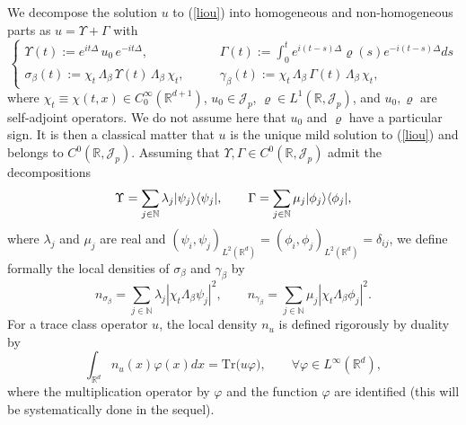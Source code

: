 \documentclass[12pt]{article}
\def \Rm {\mathbb R}
\def \Nm {\mathbb N}
\newcommand{\ds}{\displaystyle}
\newcommand{\Tr}{\textrm{Tr}}
\newcommand{\calJ}{\mathcal J}
\def\fref#1{{\rm (\ref{#1})}}
\newcommand{\be}{\begin{equation}}
\newcommand{\ee}{\end{equation}}
\DeclarePairedDelimiter\bra{\langle}{\rvert}
\DeclarePairedDelimiter\ket{\lvert}{\rangle}
\begin{document}
We decompose the solution $u$ to \fref{liou} into homogeneous and non-homogeneous parts as  $u=\Upsilon+\Gamma$ with
\be \label{defop}
\left\{
\begin{array}{ll} \ds \Upsilon(t):=e^{i t \Delta} \,u_0\, e^{-i t\Delta}, &\qquad \ds \Gamma(t):=\int_0^t e^{i (t-s) \Delta} \varrho(s) e^{-i (t-s) \Delta} ds\\
 \ds \sigma_\beta(t) := \chi_t\, \Lambda_\beta\, \Upsilon(t)\,  \Lambda_\beta\,  \chi_t, &\qquad \ds \gamma_\beta(t) := \chi_t\, \Lambda_\beta\, \Gamma(t)\,  \Lambda_\beta\,  \chi_t,
\end{array}
\right.
\ee
where $\chi_t \equiv \chi(t,x) \in C_0^\infty(\Rm^{d+1})$, $u_0 \in \calJ_p$, $\varrho \in L^1(\Rm,\calJ_p)$, and $u_0,\varrho$ are self-adjoint operators. We do not assume here that $u_0$ and $\varrho$ have a particular sign. It is then a classical matter that $u$ is the unique mild solution to \fref{liou} and belongs to $C^0(\Rm,\calJ_p)$. Assuming that $\Upsilon, \Gamma \in C^0(\Rm,\calJ_p)$ admit the decompositions
$$
\Upsilon=\sum_{j \in \Nm} \lambda_j \ket{\psi_j} \bra{\psi_j}, \qquad \Gamma=\sum_{j \in \Nm} \mu_j \ket{\phi_j} \bra{\phi_j},
$$
where $\lambda_j$ and $\mu_j$ are real and $(\psi_i,\psi_j)_{L^2(\Rm^d)}=(\phi_i,\phi_j)_{L^2(\Rm^d)}=\delta_{ij}$, we define formally the local densities of $\sigma_\beta$ and $\gamma_\beta$ by
\be \label{defn}
n_{\sigma_\beta}= \sum_{j \in \Nm} \lambda_j | \chi_t  \Lambda_\beta \psi_j |^2, \qquad n_{\gamma_\beta}= \sum_{j \in \Nm} \mu_j | \chi_t  \Lambda_\beta \phi_j|^2.
\ee
For a trace class operator $u$, the local density $n_u$ is defined rigorously by duality by
$$
\int_{\Rm^d} n_u(x) \varphi(x) dx=\Tr \big( u \varphi \big), \qquad \forall \varphi \in L^\infty(\Rm^d),
$$
where the multiplication operator by $\varphi$ and the function $\varphi$ are identified (this will be systematically done in the sequel).
\end{document}
